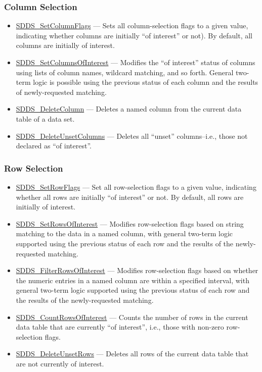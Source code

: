 \documentclass[11pt]{article}
\newcommand{\progref}[1]{\hyperref{SDDS_#1}{{\tt SDDS\_#1} (}{)}{SDDS_#1}}
\begin{document}
\subsubsection{Column Selection}

\begin{itemize}
\item \progref{SetColumnFlags} --- Sets all column-selection flags to a given value, indicating whether columns are initially ``of interest'' or not). By default, all columns are initially of interest.
\item \progref{SetColumnsOfInterest} --- Modifies the ``of interest'' status of columns using lists of column names, wildcard matching, and so forth. General two-term logic is possible using the previous status of each column and the results of newly-requested matching.
\item \progref{DeleteColumn} --- Deletes a named column from the current data table of a data set.
\item \progref{DeleteUnsetColumns} --- Deletes all ``unset'' columns--i.e., those not declared as ``of interest''. 
\end{itemize}

\subsubsection{Row Selection}

\begin{itemize}
\item \progref{SetRowFlags} --- Set all row-selection flags to a given value, indicating whether all rows are initially ``of interest'' or not. By default, all rows are initially of interest.
\item \progref{SetRowsOfInterest} --- Modifies row-selection flags based on string matching to the data in a named column, with general two-term logic supported using the previous status of each row and the results of the newly-requested matching.
\item \progref{FilterRowsOfInterest} --- Modifies row-selection flags based on whether the numeric entries in a named column are within a specified interval, with general two-term logic supported using the previous status of each row and the results of the newly-requested matching.
\item \progref{CountRowsOfInterest} --- Counts the number of rows in the current data table that are currently ``of interest'', i.e., those with non-zero row-selection flags.
\item \progref{DeleteUnsetRows} --- Deletes all rows of the current data table that are not currently of interest. 
\end{itemize}
\end{document}
